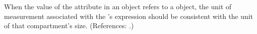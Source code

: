 When the value of the attribute  in an \InitialAssignment
object refers to a \Compartment object, the unit of measurement associated
with the \InitialAssignment's  expression should be consistent
with the unit of that compartment's size.  (References: .)
